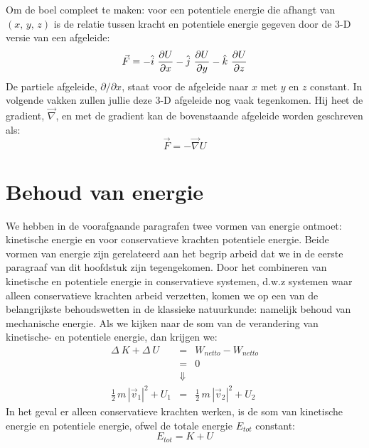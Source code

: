 Om de boel compleet te maken: voor een potentiele energie die afhangt van $(x,\,y,\,z)$ is de relatie 
tussen kracht en potentiele energie gegeven door de 3-D versie van een afgeleide:
\begin{equation}
\vec{F} = -\hat{i}~ \frac{\partial U}{\partial x} -\hat{j}~ \frac{\partial U}{\partial y} -\hat{k}~ \frac{\partial U}{\partial z} 
\end{equation}
De partiele afgeleide, $\partial /\partial x$, staat voor de afgeleide naar $x$ met $y$ en $z$ constant.
In volgende vakken zullen jullie deze 3-D afgeleide nog vaak tegenkomen. Hij heet de gradient, $\vec{\nabla}$, en 
met de gradient kan de bovenstaande afgeleide worden geschreven als:
\begin{equation}
\vec{F} = -\vec{\nabla} U
\end{equation}

\section{Behoud van energie}

We hebben in de voorafgaande paragrafen twee vormen van energie ontmoet: kinetische
energie
en voor conservatieve krachten potentiele energie. Beide vormen van energie zijn gerelateerd
aan het begrip arbeid dat we in de eerste paragraaf van dit hoofdstuk zijn tegengekomen.
Door het combineren van kinetische en potentiele energie in conservatieve systemen, d.w.z 
systemen waar alleen conservatieve krachten arbeid verzetten, komen we op een van de 
belangrijkste behoudswetten in de klassieke natuurkunde: namelijk behoud van mechanische
energie. Als we 
kijken naar de som van de verandering van kinetische- en potentiele energie, dan
krijgen we:
\begin{eqnarray}
\Delta~K + \Delta~U & = & W_{netto}-W_{netto} \\
                                     & = & 0 \\
                                     & \Downarrow & \\
\frac{1}{2}\,m\,|\vec{v}_1|^2 + U_1 & = & \frac{1}{2}\,m\,|\vec{v}_2|^2+U_2
\end{eqnarray}
In het geval er alleen conservatieve krachten werken, is de som van kinetische energie
en potentiele energie, ofwel de totale energie $E_{tot}$ constant:
\begin{equation}
E_{tot} = K + U
\end{equation}

